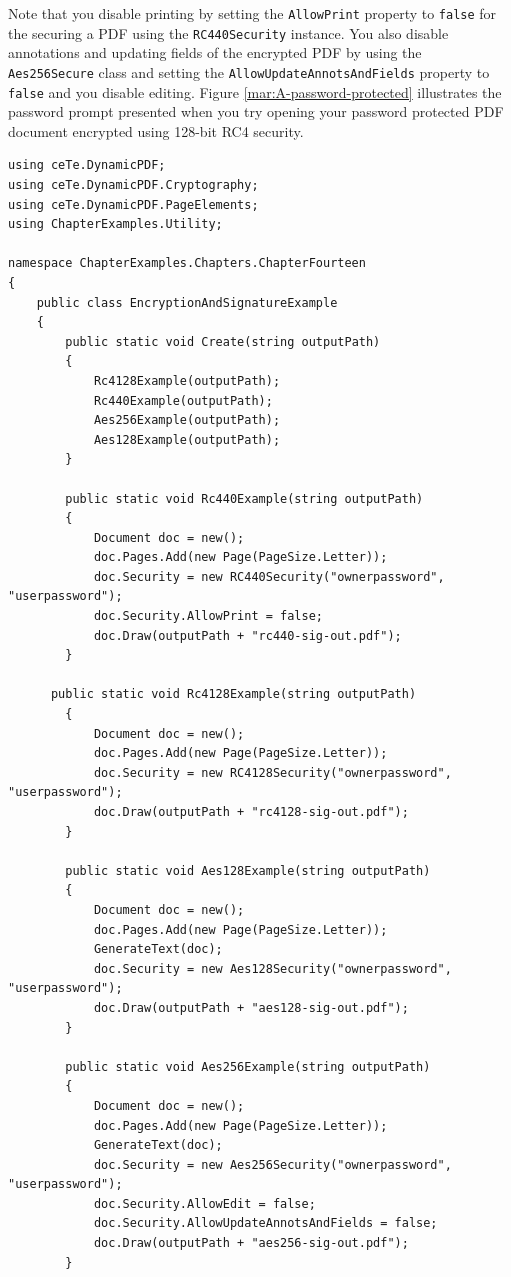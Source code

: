 \documentclass[american]{tufte-book}
\numberwithin{equation}{section}
\numberwithin{figure}{section}
\begin{document}
{Note that you disable printing by setting the \texttt{AllowPrint} property
to \texttt{false} for the securing a PDF using the \texttt{RC440Security}
instance. You also disable annotations and updating fields of the encrypted
PDF by using the \texttt{Aes256Secure} class and setting the \texttt{AllowUpdateAnnotsAndFields}
property to \texttt{false} and you disable editing. Figure \ref{mar:A-password-protected}
illustrates the password prompt presented when you try opening
your password protected PDF document encrypted using 128-bit RC4 security.

\bgroup{}
\begin{lstlisting}[caption={Encrypting and signing a PDF document.},label={lis:Encrypting-and-signing},basicstyle={\footnotesize\ttfamily},breaklines=true]
using ceTe.DynamicPDF;
using ceTe.DynamicPDF.Cryptography;
using ceTe.DynamicPDF.PageElements;
using ChapterExamples.Utility;

namespace ChapterExamples.Chapters.ChapterFourteen
{
    public class EncryptionAndSignatureExample
    {
        public static void Create(string outputPath)
        {
            Rc4128Example(outputPath);
            Rc440Example(outputPath);
            Aes256Example(outputPath);
            Aes128Example(outputPath);
        }
        
        public static void Rc440Example(string outputPath)
        {
            Document doc = new();
            doc.Pages.Add(new Page(PageSize.Letter));
            doc.Security = new RC440Security("ownerpassword", "userpassword");
            doc.Security.AllowPrint = false;
            doc.Draw(outputPath + "rc440-sig-out.pdf");
        }
        
      public static void Rc4128Example(string outputPath)
        {
            Document doc = new();
            doc.Pages.Add(new Page(PageSize.Letter));
            doc.Security = new RC4128Security("ownerpassword", "userpassword");
            doc.Draw(outputPath + "rc4128-sig-out.pdf");
        }

        public static void Aes128Example(string outputPath)
        {
            Document doc = new();
            doc.Pages.Add(new Page(PageSize.Letter));
            GenerateText(doc);
            doc.Security = new Aes128Security("ownerpassword", "userpassword");
            doc.Draw(outputPath + "aes128-sig-out.pdf");
        }

        public static void Aes256Example(string outputPath)
        {
            Document doc = new();
            doc.Pages.Add(new Page(PageSize.Letter));
            GenerateText(doc);
            doc.Security = new Aes256Security("ownerpassword", "userpassword");
            doc.Security.AllowEdit = false;
            doc.Security.AllowUpdateAnnotsAndFields = false;
            doc.Draw(outputPath + "aes256-sig-out.pdf");
        }


\end{lstlisting}}
\end{document}
